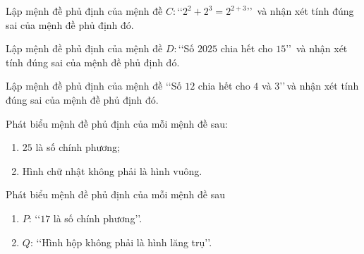 \begin{bt}%
Lập mệnh đề phủ định của mệnh đề $C\colon$\lq\lq $2^2+2^3=2^{2+3}$\rq\rq\, và nhận xét tính đúng sai của mệnh đề phủ định đó.
\end{bt}

\begin{bt}%
Lập mệnh đề phủ định của mệnh đề $D\colon$\lq\lq Số $2025$ chia hết cho $15$\rq\rq\, và nhận xét tính đúng sai của mệnh đề phủ định đó.
\end{bt}

\begin{bt}%
Lập mệnh đề phủ định của mệnh đề \lq\lq Số $12$ chia hết cho $4$ và $3$\rq\rq\,và nhận xét tính đúng sai của mệnh đề phủ định đó.
\end{bt}

\begin{bt}%
	Phát biểu mệnh đề phủ định của mỗi mệnh đề sau:
	\begin{enumerate}
		\item $25$ là số chính phương;
		\item Hình chữ nhật không phải là hình vuông.
	\end{enumerate}
\end{bt}

\begin{bt}%
	Phát biểu mệnh đề phủ định của mỗi mệnh đề sau 
	\begin{enumerate}
		\item $P$: \lq\lq$17$ là số chính phương\rq\rq.
		\item $Q$: \lq\lq Hình hộp không phải là hình lăng trụ\rq\rq.
	\end{enumerate}
\end{bt}

